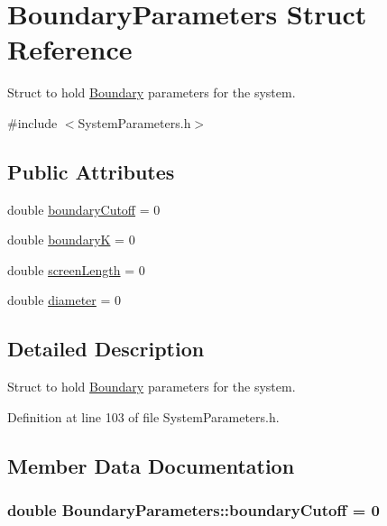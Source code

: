 \hypertarget{structBoundaryParameters}{\section{Boundary\+Parameters Struct Reference}
\label{structBoundaryParameters}
}


Struct to hold \hyperlink{classBoundary}{Boundary} parameters for the system.  




{\ttfamily \#include $<$System\+Parameters.\+h$>$}

\subsection*{Public Attributes}
\begin{DoxyCompactItemize}
\item 
double \hyperlink{structBoundaryParameters_a90e9efca0ade0a603523945c49056edd}{boundary\+Cutoff} = 0
\item 
double \hyperlink{structBoundaryParameters_aeb92b89caa0bf379a2dd1e26a032bb75}{boundary\+K} = 0
\item 
double \hyperlink{structBoundaryParameters_a75161f641debbb58f2829d8bba03b532}{screen\+Length} = 0
\item 
double \hyperlink{structBoundaryParameters_aff24f2bccaef825eff7c3181ec1cefcc}{diameter} = 0
\end{DoxyCompactItemize}


\subsection{Detailed Description}
Struct to hold \hyperlink{classBoundary}{Boundary} parameters for the system. 

Definition at line 103 of file System\+Parameters.\+h.



\subsection{Member Data Documentation}
\hypertarget{structBoundaryParameters_a90e9efca0ade0a603523945c49056edd}{
\subsubsection[{boundary\+Cutoff}]{\setlength{\rightskip}{0pt plus 5cm}double Boundary\+Parameters\+::boundary\+Cutoff = 0}}\label{structBoundaryParameters_a90e9efca0ade0a603523945c49056edd}


